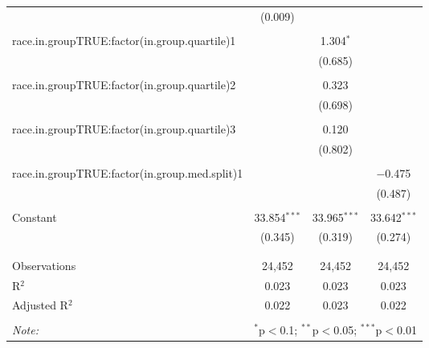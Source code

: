 \begin{table}[!htbp]
\begin{tabular}{@{\extracolsep{5pt}}lccc}
  & (0.009) &  &  \\ 
  & & & \\ 
 race.in.groupTRUE:factor(in.group.quartile)1 &  & 1.304$^{*}$ &  \\ 
  &  & (0.685) &  \\ 
  & & & \\ 
 race.in.groupTRUE:factor(in.group.quartile)2 &  & 0.323 &  \\ 
  &  & (0.698) &  \\ 
  & & & \\ 
 race.in.groupTRUE:factor(in.group.quartile)3 &  & 0.120 &  \\ 
  &  & (0.802) &  \\ 
  & & & \\ 
 race.in.groupTRUE:factor(in.group.med.split)1 &  &  & $-$0.475 \\ 
  &  &  & (0.487) \\ 
  & & & \\ 
 Constant & 33.854$^{***}$ & 33.965$^{***}$ & 33.642$^{***}$ \\ 
  & (0.345) & (0.319) & (0.274) \\ 
  & & & \\ 
\hline \\[-1.8ex] 
Observations & 24,452 & 24,452 & 24,452 \\ 
R$^{2}$ & 0.023 & 0.023 & 0.023 \\ 
Adjusted R$^{2}$ & 0.022 & 0.023 & 0.022 \\ 
\hline 
\hline \\[-1.8ex] 
\textit{Note:}  & \multicolumn{3}{r}{$^{*}$p$<$0.1; $^{**}$p$<$0.05; $^{***}$p$<$0.01} \\ 
\end{tabular} 
\end{table} 
